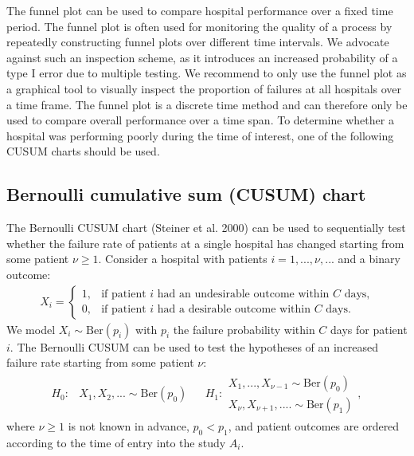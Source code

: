 The funnel plot can be used to compare hospital performance over a fixed time period. The funnel plot is often used for monitoring the quality of a process by repeatedly constructing funnel plots over different time intervals. We advocate against such an inspection scheme, as it introduces an increased probability of a type I error due to multiple testing. We recommend to only use the funnel plot as a graphical tool to visually inspect the proportion of failures at all hospitals over a time frame. The funnel plot is a discrete time method and can therefore only be used to compare overall performance over a time span. To determine whether a hospital was performing poorly during the time of interest, one of the following CUSUM charts should be used.

\hypertarget{BernoulliCUSUM}{%
\subsection{Bernoulli cumulative sum (CUSUM) chart}\label{BernoulliCUSUM}}

The Bernoulli CUSUM chart (Steiner et al. 2000) can be used to sequentially test whether the failure rate of patients at a single hospital has changed starting from some patient \(\nu \geq 1\). Consider a hospital with patients \(i = 1, ..., \nu, ...\) and a binary outcome:
\begin{align}
X_{i} = \begin{cases}
1, & \text{if patient } i \text{ had an undesirable outcome within $C$ days,} \\
0, & \text{if patient } i  \text{ had a desirable outcome within $C$ days.}
\end{cases}
\label{eq:BernoulliOutcome}
\end{align}
We model \(X_i \sim \mathrm{Ber}(p_i)\) with \(p_i\) the failure probability within \(C\) days for patient \(i\). The Bernoulli CUSUM can be used to test the hypotheses of an increased failure rate starting from some patient \(\nu\):
\begin{equation}
\begin{aligned}
H_0: &X_1, X_2, ... \sim \text{Ber}(p_0)  & &H_1: 
\begin{array}{l}
X_1, ..., X_{\nu-1} \sim \text{Ber}(p_0)\\
X_{\nu},X_{\nu+1}, .... \sim \text{Ber}(p_1)
\end{array},
\end{aligned}
\label{eq:BernoulliHypotheses}
\end{equation}
where \(\nu \geq 1\) is not known in advance, \(p_0 < p_1\), and patient outcomes are ordered according to the time of entry into the study \(A_i\).

